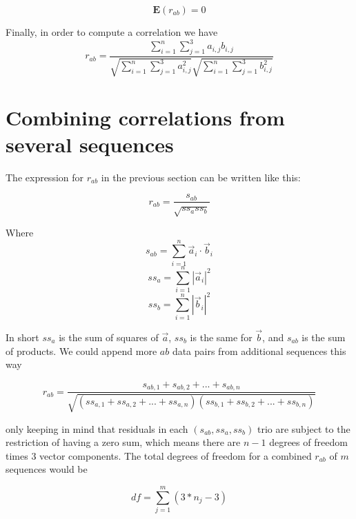 \documentclass[12pt]{article}
\begin{document}
\[ \mathbf{E}(r_{ab}) = 0 \]

Finally, in order to compute a correlation we have
\[ r_{ab} = \frac
	{ \sum_{i=1}^n \sum_{j=1}^3 a_{i,j} b_{i,j} }
	{ 	\sqrt{\sum_{i=1}^n \sum_{j=1}^3 a_{i,j}^2 }
		\sqrt{\sum_{i=1}^n \sum_{j=1}^3 b_{i,j}^2 } } \]

\section{Combining correlations from several sequences}

The expression for $r_{ab}$ in the previous section can be written like this:

\[ r_{ab} = \frac {s_{ab}} {\sqrt{ss_a  ss_b}} \]

Where
\[ s_{ab} = \sum_{i=1}^n \vec{a}_i \cdot \vec{b}_i \]
\[ ss_a = \sum_{i=1}^n |\vec{a}_i|^2 \]
\[ ss_b = \sum_{i=1}^n |\vec{b}_i|^2 \]

In short $ss_a$ is the sum of squares of $\vec{a}$, $ss_b$ is the same for $\vec{b}$, and $s_{ab}$ is the sum of products. We could append more $ab$ data pairs from additional sequences this way

\[ r_{ab} = \frac {s_{ab,1} + s_{ab,2} + ... + s_{ab,n}}
	{\sqrt{(ss_{a,1} + ss_{a,2} + ... + ss_{a,n})(ss_{b,1} + ss_{b,2} + ... + ss_{b,n})}} \]

only keeping in mind that residuals in each $(s_{ab}, ss_a, ss_b)$ trio are subject to the restriction of having a zero sum, which means there are $n-1$ degrees of freedom times $3$ vector components. The total degrees of freedom for a combined $r_{ab}$ of $m$ sequences would be

\[ df = \sum_{j=1}^m (3*n_j - 3) \]
\end{document}
